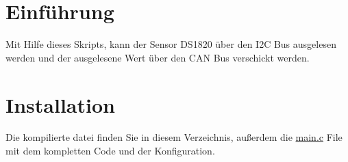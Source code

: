 \hypertarget{index_intro_sec}{}\section{Einführung}\label{index_intro_sec}
Mit Hilfe dieses Skripts, kann der Sensor D\+S1820 über den I2C Bus ausgelesen werden und der ausgelesene Wert über den C\+AN Bus verschickt werden.\hypertarget{index_install_sec}{}\section{Installation}\label{index_install_sec}
Die kompilierte datei finden Sie in diesem Verzeichnis, außerdem die \hyperlink{main_8c}{main.\+c} File mit dem kompletten Code und der Konfiguration. 